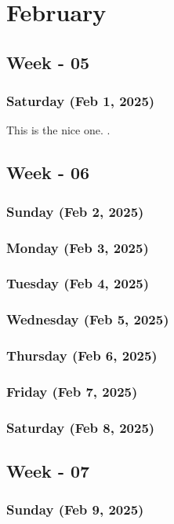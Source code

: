\chapter{February}
\hspace{1cm}

\section{Week - 05}
\subsection*{Saturday (Feb 1, 2025)}
This is the nice one. \cite{zhou2015}.

\section{Week - 06}
\subsection*{Sunday (Feb 2, 2025)}
\subsection*{Monday (Feb 3, 2025)}
\subsection*{Tuesday (Feb 4, 2025)}
\subsection*{Wednesday (Feb 5, 2025)}
\subsection*{Thursday (Feb 6, 2025)}
\subsection*{Friday (Feb 7, 2025)}
\subsection*{Saturday (Feb 8, 2025)}

\section{Week - 07}
\subsection*{Sunday (Feb 9, 2025)}
